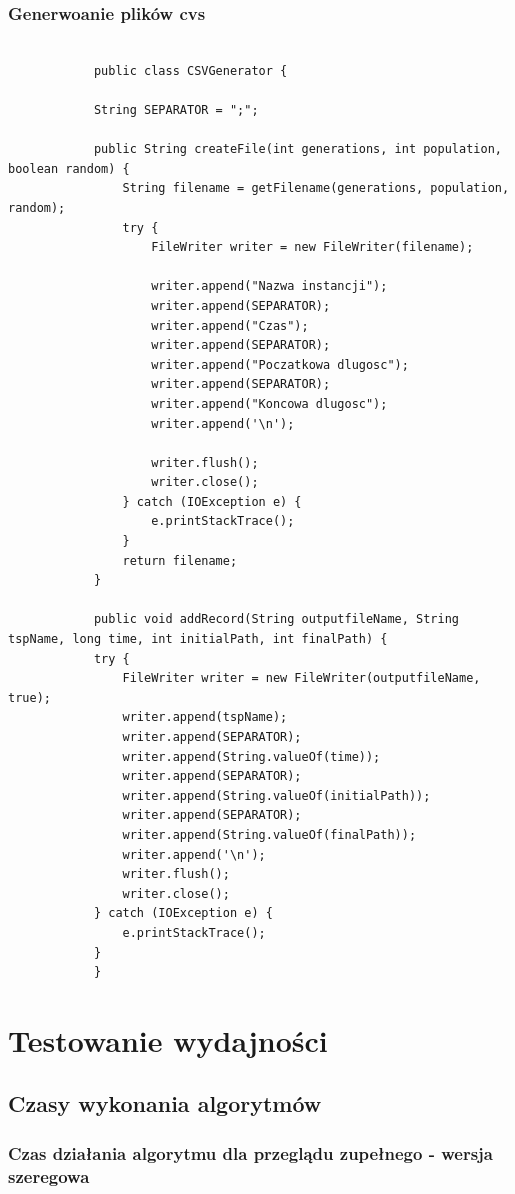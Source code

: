 \documentclass{article}
\begin{document}
		\subsubsection{Generwoanie plików cvs}
			\begin{lstlisting}[xleftmargin=-150pt]
			
			public class CSVGenerator {
			
			String SEPARATOR = ";";
			
			public String createFile(int generations, int population, boolean random) {
				String filename = getFilename(generations, population, random);
				try {
					FileWriter writer = new FileWriter(filename);
					
					writer.append("Nazwa instancji");
					writer.append(SEPARATOR);
					writer.append("Czas");
					writer.append(SEPARATOR);
					writer.append("Poczatkowa dlugosc");
					writer.append(SEPARATOR);
					writer.append("Koncowa dlugosc");
					writer.append('\n');
					
					writer.flush();
					writer.close();
				} catch (IOException e) {
					e.printStackTrace();
				}
				return filename;
			}
			
			public void addRecord(String outputfileName, String tspName, long time, int initialPath, int finalPath) {
			try {
				FileWriter writer = new FileWriter(outputfileName, true);
				writer.append(tspName);
				writer.append(SEPARATOR);
				writer.append(String.valueOf(time));
				writer.append(SEPARATOR);
				writer.append(String.valueOf(initialPath));
				writer.append(SEPARATOR);
				writer.append(String.valueOf(finalPath));
				writer.append('\n');
				writer.flush();
				writer.close();
			} catch (IOException e) {
				e.printStackTrace();
			}
			}
			\end{lstlisting}
\section{Testowanie wydajności}	
	\subsection{Czasy wykonania algorytmów}
		
		
		
		\subsubsection{Czas działania algorytmu dla przeglądu zupełnego - wersja szeregowa}
			
\end{document}
